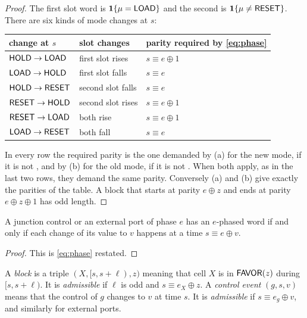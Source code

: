 \begin{proof}
The first slot word is $\mathbf{1}\{\mu=\textsf{LOAD}\}$ and the second is $\mathbf{1}\{\mu\ne\textsf{RESET}\}$. There are six
kinds of mode changes at $s$:
\begin{center}\small
\begin{tabular}{lll}\toprule
change at $s$ & slot changes & parity required by \eqref{eq:phase}\\\midrule
$\textsf{HOLD}\to\textsf{LOAD}$ & first slot rises & $s\equiv e\oplus1$\\
$\textsf{LOAD}\to\textsf{HOLD}$ & first slot falls & $s\equiv e$\\
$\textsf{HOLD}\to\textsf{RESET}$ & second slot falls & $s\equiv e$\\
$\textsf{RESET}\to\textsf{HOLD}$ & second slot rises & $s\equiv e\oplus 1$\\
$\textsf{RESET}\to\textsf{LOAD}$ & both rise & $s\equiv e\oplus1$\\
$\textsf{LOAD}\to\textsf{RESET}$ & both fall & $s\equiv e$\\\bottomrule
\end{tabular}
\end{center}
In every row the required parity is the one demanded by (a) for the new mode, if it is not \HOLD,
and by (b) for the old mode, if it is not \HOLD. When both apply, as in the last two rows, they demand
the same parity. Conversely (a) and (b) give exactly the parities of the table. A block that starts
at parity $e\oplus z$ and ends at parity $e\oplus z\oplus 1$ has odd length.
\end{proof}

\begin{lemma}\label{lem:bitphase}
A junction control or an external port of phase $e$ has an $e$-phased word if and only if each change
of its value to $v$ happens at a time $s\equiv e\oplus v$.
\end{lemma}

\begin{proof}
This is \eqref{eq:phase} restated.
\end{proof}

\begin{definition}\label{def:block}
A \emph{block} is a triple $(X,[s,s+\ell),z)$ meaning that cell $X$ is in $\textsf{FAVOR}(z)$ during
$[s,s+\ell)$. It is \emph{admissible} if $\ell$ is odd and $s\equiv e_X\oplus z$. A \emph{control
event} $(g,s,v)$ means that the control of $g$ changes to $v$ at time $s$. It is \emph{admissible} if
$s\equiv e_g\oplus v$, and similarly for external ports.
\end{definition}

